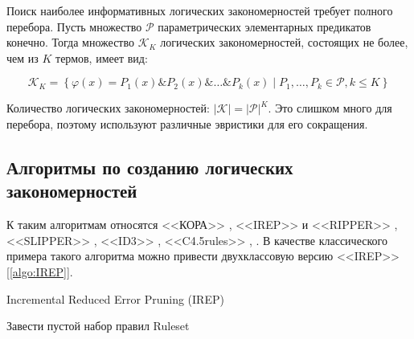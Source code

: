 \documentclass[12pt]{article}
\begin{document}

Поиск наиболее информативных логических закономерностей требует
полного перебора. Пусть множество \(\mathcal{P}\) параметрических
элементарных предикатов конечно. Тогда множество \(\mathcal{K}_K\)
логических закономерностей, состоящих не более, чем из \(K\) термов,
имеет вид:

\[
\mathcal{K}_K =
\left\{
 \varphi(x) = P_1(x) \& P_2(x) \& \dots \& P_k(x) \mid
  P_1, \dots, P_k \in \mathcal{P}, k \leq K
\right\}
\]

Количество логических закономерностей: \(\lvert \mathcal{K} \rvert =
\lvert \mathcal{P} \rvert^{K}\). Это слишком много для перебора,
поэтому используют различные эвристики для его сокращения.

\subsection{Алгоритмы по созданию логических закономерностей}

К таким алгоритмам относятся <<КОРА>> \cite{vainzvaig73kora}, <<IREP>>
и <<RIPPER>> \cite{cohen95fast}, <<SLIPPER>> \cite{cohen99simple},
<<ID3>> \cite{quinlan86induction}, <<C4.5rules>>
\cite{quinlan93programs}, \cite{quinlan96bagging}.  В качестве
классического примера такого алгоритма можно привести двухклассовую
версию <<IREP>> [\ref{algo:IREP}].

\begin{algorithm}[!htpb]
  \caption{Incremental Reduced Error Pruning (IREP)}\label{algo:IREP}
   {
    Завести пустой набор правил Ruleset\;
    \;
  }
\end{algorithm}
\end{document}
